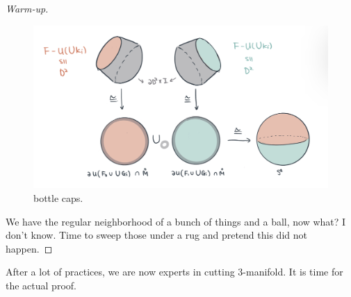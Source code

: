 \documentclass[12pt]{amsart}
\theoremstyle{remark}
\begin{document}
\begin{proof}[Warm-up]
	 \begin{figure}
	 	\centering
	 	\includegraphics[width = 1\textwidth]{IMG2.png}
	 	\caption{bottle caps.}
	 	\label{fig:bottlecap}
	 \end{figure}

	 We have the regular neighborhood of a bunch of things and a ball, now what? I don't know. Time to sweep those under a rug and pretend this did not happen.
\end{proof}

After a lot of practices, we are now experts in cutting 3-manifold. It is time for the actual proof. 
\end{document}

